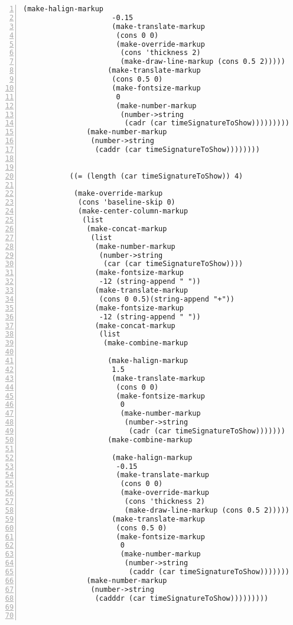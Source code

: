 \begin{Verbatim}[numbers=left,xleftmargin=5mm]
                    (make-halign-markup
                     -0.15
                     (make-translate-markup
                      (cons 0 0)
                      (make-override-markup
                       (cons 'thickness 2)
                       (make-draw-line-markup (cons 0.5 2)))))
                    (make-translate-markup
                     (cons 0.5 0)
                     (make-fontsize-markup
                      0
                      (make-number-markup
                       (number->string
                        (cadr (car timeSignatureToShow)))))))))))
               (make-number-markup
                (number->string
                 (caddr (car timeSignatureToShow))))))))


           ((= (length (car timeSignatureToShow)) 4)

            (make-override-markup
             (cons 'baseline-skip 0)
             (make-center-column-markup
              (list
               (make-concat-markup
                (list
                 (make-number-markup
                  (number->string
                   (car (car timeSignatureToShow))))
                 (make-fontsize-markup
                  -12 (string-append " "))
                 (make-translate-markup
                  (cons 0 0.5)(string-append "+"))
                 (make-fontsize-markup
                  -12 (string-append " "))
                 (make-concat-markup
                  (list
                   (make-combine-markup

                    (make-halign-markup
                     1.5
                     (make-translate-markup
                      (cons 0 0)
                      (make-fontsize-markup
                       0
                       (make-number-markup
                        (number->string
                         (cadr (car timeSignatureToShow)))))))
                    (make-combine-markup

                     (make-halign-markup
                      -0.15
                      (make-translate-markup
                       (cons 0 0)
                       (make-override-markup
                        (cons 'thickness 2)
                        (make-draw-line-markup (cons 0.5 2)))))
                     (make-translate-markup
                      (cons 0.5 0)
                      (make-fontsize-markup
                       0
                       (make-number-markup
                        (number->string
                         (caddr (car timeSignatureToShow))))))))))))
               (make-number-markup
                (number->string
                 (cadddr (car timeSignatureToShow)))))))))



\end{Verbatim}
